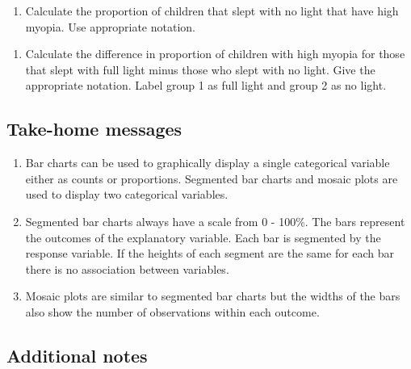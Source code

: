 \documentclass[
]{report}
\providecommand{\tightlist}{%
  \setlength{\itemsep}{0pt}\setlength{\parskip}{0pt}}
\begin{document}
\vspace{0.3in}

\begin{enumerate}
\def\labelenumi{\arabic{enumi}.}
\setcounter{enumi}{12}
\tightlist
\item
  Calculate the proportion of children that slept with no light that have high myopia. Use appropriate notation.
\end{enumerate}

\vspace{0.3in}

\begin{enumerate}
\def\labelenumi{\arabic{enumi}.}
\setcounter{enumi}{13}
\tightlist
\item
  Calculate the difference in proportion of children with high myopia for those that slept with full light minus those who slept with no light. Give the appropriate notation. Label group 1 as full light and group 2 as no light.
\end{enumerate}

\vspace{0.3in}

\hypertarget{take-home-messages-4}{%
\subsection{Take-home messages}\label{take-home-messages-4}}

\begin{enumerate}
\def\labelenumi{\arabic{enumi}.}
\item
  Bar charts can be used to graphically display a single categorical variable either as counts or proportions. Segmented bar charts and mosaic plots are used to display two categorical variables.
\item
  Segmented bar charts always have a scale from 0 - 100\%. The bars represent the outcomes of the explanatory variable. Each bar is segmented by the response variable. If the heights of each segment are the same for each bar there is no association between variables.
\item
  Mosaic plots are similar to segmented bar charts but the widths of the bars also show the number of observations within each outcome.
\end{enumerate}

\hypertarget{additional-notes-4}{%
\subsection{Additional notes}\label{additional-notes-4}}
\end{document}
